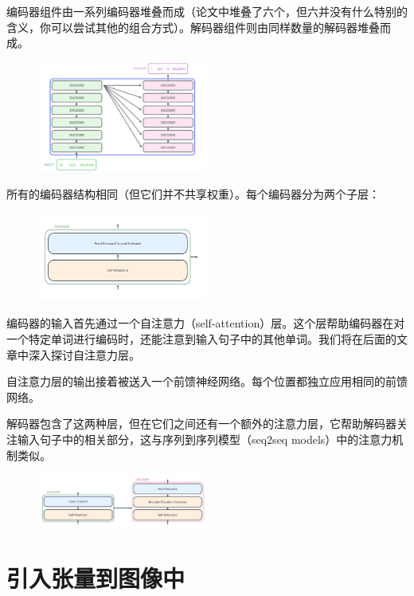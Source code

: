 \documentclass[cn,hazy,blue,10pt,normal]{elegantnote}
\begin{document}
编码器组件由一系列编码器堆叠而成（论文中堆叠了六个，但六并没有什么特别的含义，你可以尝试其他的组合方式）。解码器组件则由同样数量的解码器堆叠而成。
\begin{figure}[!h]
	\centering
	\includegraphics[width=0.5\textwidth]{image/The_transformer_encoder_decoder_stack.png}
\end{figure}

所有的编码器结构相同（但它们并不共享权重）。每个编码器分为两个子层：
\begin{figure}[h]
	\vspace{-10mm}
	\centering
	\includegraphics[width=0.5\textwidth]{image/Transformer_encoder.png}
\end{figure}

编码器的输入首先通过一个自注意力（self-attention）层。这个层帮助编码器在对一个特定单词进行编码时，还能注意到输入句子中的其他单词。我们将在后面的文章中深入探讨自注意力层。

自注意力层的输出接着被送入一个前馈神经网络。每个位置都独立应用相同的前馈网络。

解码器包含了这两种层，但在它们之间还有一个额外的注意力层，它帮助解码器关注输入句子中的相关部分，这与序列到序列模型（seq2seq models）中的注意力机制类似。
\begin{figure}[h]
	\centering
	\includegraphics[width=0.5\textwidth]{image/Transformer_decoder.png}
\end{figure}

\section{引入张量到图像中}
\end{document}
